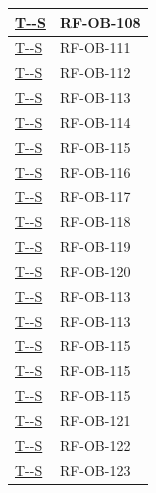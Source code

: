 \documentclass[a4paper,12pt]{article}
\newcounter{testsys}
\newcommand{\systestref}{%
  \hyperlink{T-\arabic{testsys}-S}{T-\arabic{testsys}-S}%
}
\begin{document}
\begin{longtable}{|>{\centering\arraybackslash}p{5cm}|>{\centering\arraybackslash}p{9cm}|}
\stepcounter{testsys}
\systestref & RF-OB-108 \\
\hline

\stepcounter{testsys}
\systestref & RF-OB-111 \\
\hline

\stepcounter{testsys}
\systestref & RF-OB-112 \\
\hline

\stepcounter{testsys}
\systestref & RF-OB-113 \\
\hline

\stepcounter{testsys}
\systestref & RF-OB-114 \\
\hline

\stepcounter{testsys}
\systestref & RF-OB-115 \\
\hline

\stepcounter{testsys}
\systestref & RF-OB-116 \\
\hline

\stepcounter{testsys}
\systestref & RF-OB-117 \\
\hline

\stepcounter{testsys}
\systestref & RF-OB-118 \\
\hline

\stepcounter{testsys}
\systestref & RF-OB-119 \\
\hline

\stepcounter{testsys}
\systestref & RF-OB-120 \\
\hline

\stepcounter{testsys}
\systestref & RF-OB-113 \\
\hline

\stepcounter{testsys}
\systestref & RF-OB-113 \\
\hline

\stepcounter{testsys}
\systestref & RF-OB-115 \\
\hline

\stepcounter{testsys}
\systestref & RF-OB-115 \\
\hline

\stepcounter{testsys}
\systestref & RF-OB-115 \\
\hline

\stepcounter{testsys}
\systestref & RF-OB-121 \\
\hline

\stepcounter{testsys}
\systestref & RF-OB-122 \\
\hline

\stepcounter{testsys}
\systestref & RF-OB-123 \\
\hline


\end{longtable}
\end{document}
